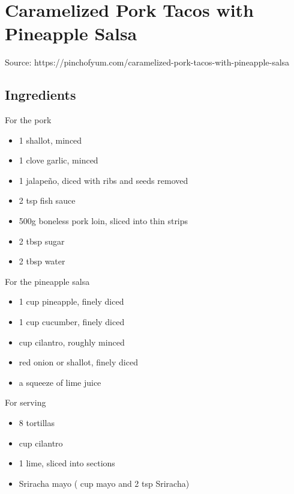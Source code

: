 \section{Caramelized Pork Tacos with Pineapple Salsa}


Source: https://pinchofyum.com/caramelized-pork-tacos-with-pineapple-salsa

\subsection{Ingredients}

\begin{multicols}{2}
    For the pork

    \begin{itemize}
        \item 1 shallot, minced
        \item 1 clove garlic, minced
        \item 1 jalapeño, diced with ribs and seeds removed
        \item 2 tsp fish sauce
        \item 500g boneless pork loin, sliced into thin strips
        \item 2 tbsp sugar
        \item 2 tbsp water
    \end{itemize}

    \vfill\null
    \columnbreak

    For the pineapple salsa

    \begin{itemize}
        \item 1 cup pineapple, finely diced
        \item 1 cup cucumber, finely diced
        \item {} cup cilantro, roughly minced
        \item {} red onion or shallot, finely diced
        \item a squeeze of lime juice
    \end{itemize}

    For serving

    \begin{itemize}
        \item 8 tortillas
        \item {} cup cilantro
        \item 1 lime, sliced into sections
        \item Sriracha mayo ( cup mayo and 2 tsp Sriracha)
    \end{itemize}
\end{multicols}

